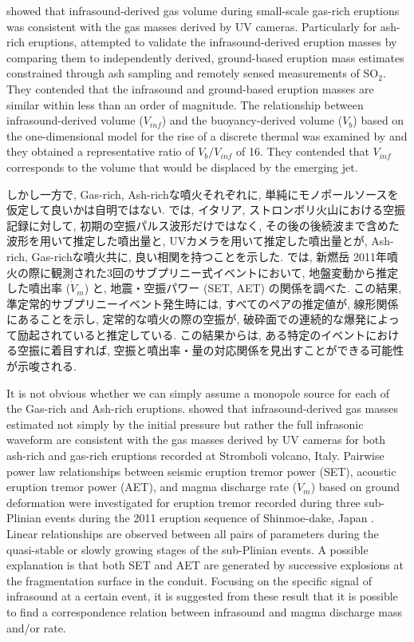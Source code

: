 \documentclass[12pt]{article}
\begin{document}
\cite{Dalton2010} showed that infrasound-derived gas volume during small-scale gas-rich eruptions was consistent with the gas masses derived by UV cameras.
Particularly for ash-rich eruptions, \cite{Fee2017a} attempted to validate the infrasound-derived eruption masses by comparing them to independently derived, ground-based eruption mass estimates constrained through ash sampling and remotely sensed measurements of SO$_2$. They contended that the infrasound and ground-based eruption masses are similar within less than an order of magnitude.
The relationship between infrasound-derived volume ($V_{inf}$) and the buoyancy-derived volume ($V_{b}$) based on the one-dimensional model for the rise of a discrete thermal was examined by \cite{Yamada2018b} and they obtained a representative ratio of $V_{b}/V_{inf}$ of 16. 
They contended that $V_{inf}$ corresponds to the volume that would be displaced by the emerging jet.

しかし一方で, Gas-rich, Ash-richな噴火それぞれに, 単純にモノポールソースを仮定して良いかは自明ではない. \cite{DelleDonne2016} では, イタリア, ストロンボリ火山における空振記録に対して, 初期の空振パルス波形だけではなく, その後の後続波まで含めた波形を用いて推定した噴出量と, UVカメラを用いて推定した噴出量とが, Ash-rich, Gas-richな噴火共に, 良い相関を持つことを示した. 
\cite{Ichihara2016a}では, 新燃岳 2011年噴火の際に観測された3回のサブプリニー式イベントにおいて, 地盤変動から推定した噴出率 ($\dot{V}_m$) と, 地震・空振パワー (SET, AET) の関係を調べた. 
この結果, 準定常的サブプリニーイベント発生時には, すべてのペアの推定値が, 線形関係にあることを示し, 定常的な噴火の際の空振が, 破砕面での連続的な爆発によって励起されていると推定している. 
この結果からは, ある特定のイベントにおける空振に着目すれば, 空振と噴出率・量の対応関係を見出すことができる可能性が示唆される.

It is not obvious whether we can simply assume a monopole source for each of the Gas-rich and Ash-rich eruptions.
\cite{DelleDonne2016} showed that infrasound-derived gas masses estimated not simply by the initial pressure but rather the full infrasonic waveform are consistent with the gas masses derived by UV cameras for both ash-rich and gas-rich eruptions recorded at Stromboli volcano, Italy.
Pairwise power law relationships between seismic eruption tremor power (SET), acoustic eruption tremor
power (AET), and magma discharge rate ($\dot{V}_m$) based on ground deformation were investigated for eruption tremor recorded during three sub-Plinian events during the 2011 eruption sequence of Shinmoe-dake, Japan \citep{Ichihara2016a}. 
Linear relationships are observed between all pairs of parameters during the quasi-stable or slowly growing stages of the sub-Plinian events. 
A possible explanation is that both SET and AET are generated by successive explosions at the fragmentation surface in the conduit. 
Focusing on the specific signal of infrasound at a certain event, it is suggested from these result that it is possible to find a correspondence relation between infrasound and magma discharge mass and/or rate.
\end{document}
